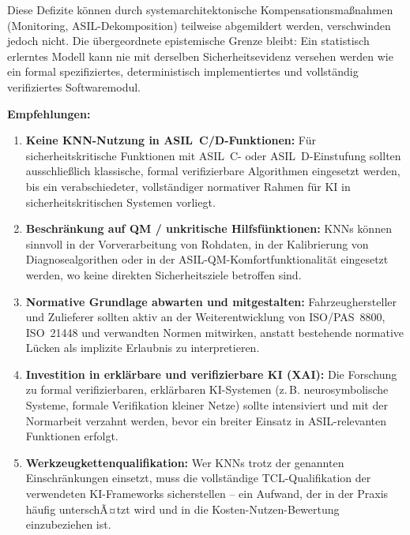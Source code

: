 ﻿\documentclass[12pt,a4paper]{article}
\begin{document}
Diese Defizite k\"onnen durch systemarchitektonische Kompensationsma\ss{}nahmen
(Monitoring, ASIL-Dekomposition) teilweise abgemildert werden, verschwinden jedoch
nicht. Die \"ubergeordnete epistemische Grenze bleibt: Ein statistisch erlerntes
Modell kann nie mit derselben Sicherheitsevidenz versehen werden wie ein formal
spezifiziertes, deterministisch implementiertes und vollst\"andig verifiziertes
Softwaremodul.

\bigskip
\noindent\textbf{Empfehlungen:}

\begin{enumerate}[itemsep=4pt]
  \item \textbf{Keine KNN-Nutzung in ASIL~C/D-Funktionen:} F\"ur sicherheitskritische
    Funktionen mit ASIL~C- oder ASIL~D-Einstufung sollten ausschlie\ss{}lich klassische,
    formal verifizierbare Algorithmen eingesetzt werden, bis ein verabschiedeter,
    vollst\"andiger normativer Rahmen f\"ur KI in sicherheitskritischen Systemen vorliegt.

  \item \textbf{Beschr\"ankung auf QM / unkritische Hilfsf\"unktionen:} KNNs k\"onnen
    sinnvoll in der Vorverarbeitung von Rohdaten, in der Kalibrierung von
    Diagnosealgorithen oder in der ASIL-QM-Komfortfunktionalit\"at eingesetzt werden,
    wo keine direkten Sicherheitsziele betroffen sind.

  \item \textbf{Normative Grundlage abwarten und mitgestalten:} Fahrzeughersteller
    und Zulieferer sollten aktiv an der Weiterentwicklung von ISO/PAS~8800,
    ISO~21448 und verwandten Normen mitwirken, anstatt bestehende normative L\"ucken
    als implizite Erlaubnis zu interpretieren.

  \item \textbf{Investition in erkl\"arbare und verifizierbare KI (XAI):} Die
    Forschung zu formal verifizierbaren, erkl\"arbaren KI-Systemen (z.\,B.
    neurosymbolische Systeme, formale Verifikation kleiner Netze) sollte
    intensiviert und mit der Normarbeit verzahnt werden, bevor ein breiter
    Einsatz in ASIL-relevanten Funktionen erfolgt.

  \item \textbf{Werkzeugkettenqualifikation:} Wer KNNs trotz der genannten
    Einschr\"ankungen einsetzt, muss die vollst\"andige TCL-Qualifikation der
    verwendeten KI-Frameworks sicherstellen -- ein Aufwand, der in der Praxis
    h\"aufig unterschÃ¤tzt wird und in die Kosten-Nutzen-Bewertung einzubeziehen ist.
\end{enumerate}
\end{document}
